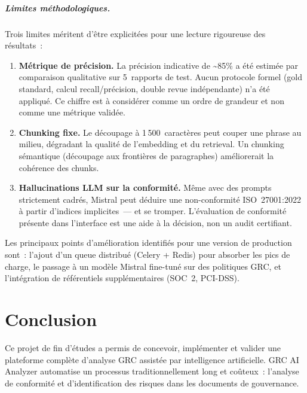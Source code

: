 \documentclass[a4paper,12pt,oneside]{report}
\begin{document}
	\paragraph{Limites m\'ethodologiques.}
	Trois limites m\'eritent d'\^etre explicit\'ees pour une lecture rigoureuse des r\'esultats~:
	\begin{enumerate}[leftmargin=1.5em,itemsep=4pt]
		\item \textbf{M\'etrique de pr\'ecision.} La pr\'ecision indicative de \textasciitilde85\% a \'et\'e estim\'ee par comparaison qualitative sur 5~rapports de test. Aucun protocole formel (gold standard, calcul recall/pr\'ecision, double revue ind\'ependante) n'a \'et\'e appliqu\'e. Ce chiffre est \`a consid\'erer comme un ordre de grandeur et non comme une m\'etrique valid\'ee.
		\item \textbf{Chunking fixe.} Le d\'ecoupage \`a 1\,500~caract\`eres peut couper une phrase au milieu, d\'egradant la qualit\'e de l'embedding et du retrieval. Un chunking s\'emantique (d\'ecoupage aux fronti\`eres de paragraphes) am\'eliorerait la coh\'erence des chunks.
		\item \textbf{Hallucinations LLM sur la conformit\'e.} M\^eme avec des prompts strictement cadr\'es, Mistral peut d\'eduire une non-conformit\'e ISO~27001:2022 \`a partir d'indices implicites~--- et se tromper. L'\'evaluation de conformit\'e pr\'esente dans l'interface est une aide \`a la d\'ecision, non un audit certifiant.
	\end{enumerate}
	
	Les principaux points d'am\'elioration identifi\'es pour une version de production sont~: l'ajout d'un queue distribu\'e (Celery + Redis) pour absorber les pics de charge, le passage \`a un mod\`ele Mistral fine-tun\'e sur des politiques GRC, et l'int\'egration de r\'ef\'erentiels suppl\'ementaires (SOC~2, PCI-DSS).
	
	\chapter*{Conclusion}
	
	Ce projet de fin d'\'etudes a permis de concevoir, impl\'ementer et valider une plateforme compl\`ete d'analyse GRC assist\'ee par intelligence artificielle. GRC AI Analyzer automatise un processus traditionnellement long et co\^uteux~: l'analyse de conformit\'e et d'identification des risques dans les documents de gouvernance.
	
\end{document}
